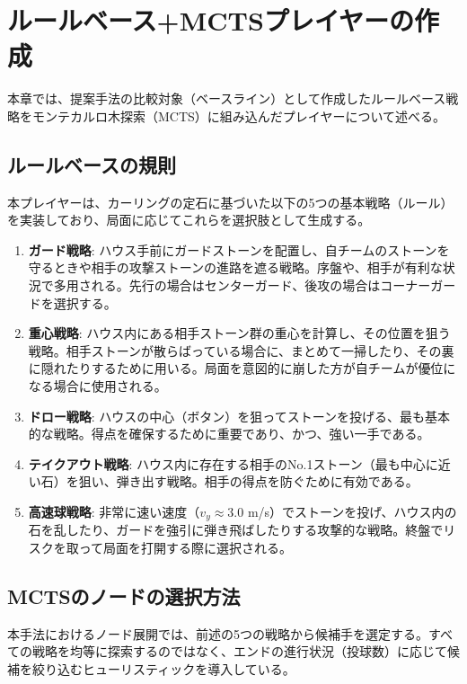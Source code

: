\documentclass[11pt,a4j]{jreport}
\begin{document}
\chapter[ルールベース+MCTSプレイヤー]{ルールベース+MCTSプレイヤーの作成}
\label{chap:rule_based_mcts}
本章では、提案手法の比較対象（ベースライン）として作成したルールベース戦略をモンテカルロ木探索（MCTS）に組み込んだプレイヤーについて述べる。

\section{ルールベースの規則}
本プレイヤーは、カーリングの定石に基づいた以下の5つの基本戦略（ルール）を実装しており、局面に応じてこれらを選択肢として生成する。

\begin{enumerate}
    \item \textbf{ガード戦略}: 
    ハウス手前にガードストーンを配置し、自チームのストーンを守るときや相手の攻撃ストーンの進路を遮る戦略。序盤や、相手が有利な状況で多用される。先行の場合はセンターガード、後攻の場合はコーナーガードを選択する。
    
    \item \textbf{重心戦略}: 
    ハウス内にある相手ストーン群の重心を計算し、その位置を狙う戦略。相手ストーンが散らばっている場合に、まとめて一掃したり、その裏に隠れたりするために用いる。局面を意図的に崩した方が自チームが優位になる場合に使用される。
    
    \item \textbf{ドロー戦略}: 
    ハウスの中心（ボタン）を狙ってストーンを投げる、最も基本的な戦略。得点を確保するために重要であり、かつ、強い一手である。
    
    \item \textbf{テイクアウト戦略}: 
    ハウス内に存在する相手のNo.1ストーン（最も中心に近い石）を狙い、弾き出す戦略。相手の得点を防ぐために有効である。
    
    \item \textbf{高速球戦略}: 
    非常に速い速度（$v_y \approx 3.0$ m/s）でストーンを投げ、ハウス内の石を乱したり、ガードを強引に弾き飛ばしたりする攻撃的な戦略。終盤でリスクを取って局面を打開する際に選択される。
\end{enumerate}

\section{MCTSのノードの選択方法}
本手法におけるノード展開では、前述の5つの戦略から候補手を選定する。すべての戦略を均等に探索するのではなく、エンドの進行状況（投球数）に応じて候補を絞り込むヒューリスティックを導入している。
\end{document}
